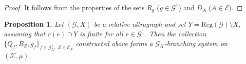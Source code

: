 \documentclass[12pt, reqno]{amsart}
\newtheorem{proposition}[theorem]{Proposition}
\theoremstyle{definition}
\theoremstyle{remark}
\numberwithin{equation}{section}
\newcommand{\G}{\mathcal{G}}
\begin{document}
\begin{proof}
    It follows from the properties of the sets $R_g$ ($g \in \G^1$) and $D_{A}$ ($A \in \mathcal{E}$).
    
\end{proof}

\begin{proposition}
Let $(\mathcal{G},X)$ be a relative ultragraph and set $Y=\mathrm{Reg}(\mathcal{G})\setminus X$,
assuming that $r(e)\cap Y$ is finite for all $e\in \mathcal{G}^1$.  
Then the collection $\{Q_f, B_Z, g_f\}_{f\in \mathcal{G}_X^1,\; Z\in \mathcal{E}_X}$ constructed above 
forms a $\mathcal{G}_X$-branching system on $(\mathcal{X},\mu)$.
\end{proposition}
  
\end{document}
